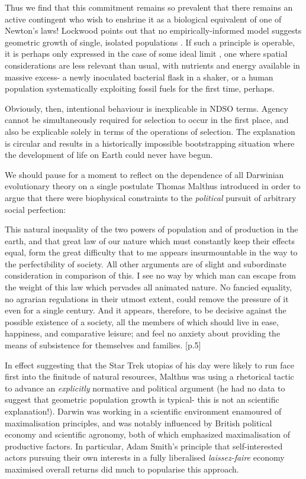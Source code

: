 Thus we find that this commitment remains so prevalent that there remains an active contingent who wish to enshrine it as a biological equivalent of one of Newton's laws! Lockwood points out that no empirically-informed model suggests geometric growth of single, isolated populations \cite{Lockwood2008}. If such a principle is operable, it is perhaps only expressed in the case of some ideal limit \cite{Holt2009}, one where spatial considerations are less relevant than usual, with nutrients and energy available in massive excess- a newly inoculated bacterial flask in a shaker, or a human population systematically exploiting fossil fuels for the first time, perhaps.

Obviously, then, intentional behaviour is inexplicable in NDSO terms. Agency cannot be simultaneously required for selection to occur in the first place, and also be explicable solely in terms of the operations of selection. The explanation is circular and results in a historically impossible bootstrapping situation where the development of life on Earth could never have begun.

We should pause for a moment to reflect on the dependence of all Darwinian evolutionary theory on a single postulate Thomas Malthus introduced in order to argue that there were biophysical constraints to the \textit{political} pursuit of arbitrary social perfection:

\begin{longquote}
This natural inequality of the two powers of population and of
production in the earth, and that great law of our nature which must
constantly keep their effects equal, form the great difficulty that to me
appears insurmountable in the way to the perfectibility of society. All
other arguments are of slight and subordinate consideration in
comparison of this. I see no way by which man can escape from the
weight of this law which pervades all animated nature. No fancied
equality, no agrarian regulations in their utmost extent, could remove
the pressure of it even for a single century. And it appears, therefore, to
be decisive against the possible existence of a society, all the members
of which should live in ease, happiness, and comparative leisure; and
feel no anxiety about providing the means of subsistence for
themselves and families.
\cite{Malthus}[p.5]
\end{longquote}

In effect suggesting that the Star Trek utopias of his day were likely to run face first into the finitude of natural resources, Malthus was using a rhetorical tactic to advance an \textit{explicitly} normative and political argument (he had no data to suggest that geometric population growth is typical- this is not an scientific explanation!). Darwin was working in a scientific environment enamoured of maximalisation principles, and was notably influenced by British political economy and scientific agronomy, both of which emphasized maximalisation of productive factors. In particular, Adam Smith's principle that self-interested actors pursuing their own interests in a fully liberalised \textit{laissez-faire} economy maximised overall returns did much to popularise this approach.


